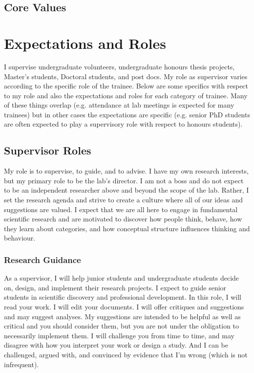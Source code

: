 \documentclass{article}
\begin{document}
\subsection{Core Values}

\section{Expectations and Roles} 
I supervise undergraduate volunteers, undergraduate honours thesis projects, Master's students, Doctoral students, and post docs. My role as supervisor varies according to the specific role of the trainee. Below are some specifics with respect to my role and also the expectations and roles for each category of trainee. Many of these things overlap (e.g. attendance at lab meetings is expected for many trainees) but in other cases the expectations are specific (e.g. senior PhD students are often expected to play a supervisory role with respect to honours students). 

\subsection{Supervisor Roles}
My role is to supervise, to guide, and to advise. I have my own research interests, but my primary role to be the lab's director. I am not a boss and do not expect to be an independent researcher above and beyond the scope of the lab. Rather, I set the research agenda and strive to create a culture where all of our ideas and suggestions are valued. I expect that we are all here to engage in fundamental scientific research and are motivated to discover how people think, behave, how they learn about categories, and how conceptual structure influences thinking and behaviour. 


\subsubsection{Research Guidance} 
As a supervisor, I will help junior students and undergraduate students decide on, design, and implement their research projects. I expect to guide senior students in scientific discovery and professional development. In this role, I will read your work. I will edit your documents. I will offer critiques and suggestions and may suggest analyses. My suggestions are intended to be helpful as well as critical and you should consider them, but you are not under the obligation to necessarily implement them.  I will challenge you from time to time, and may disagree with how you interpret your work or design a study. And I can be challenged, argued with, and convinced by evidence that I'm wrong (which is not infrequent).
\end{document}
